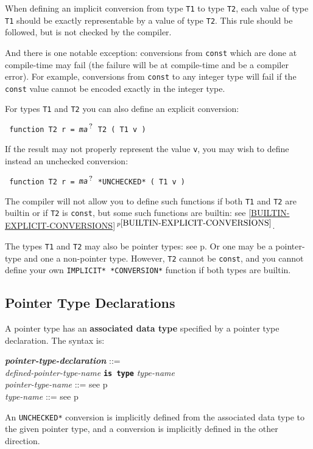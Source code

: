 \documentclass[12pt]{article}
\newcommand{\TT}[1]{{\tt \bfseries #1}}
\newcommand{\QMARK}{{$^{\,\mbox{\footnotesize ?}}$}}
\newcommand{\key}[1]{{\rm \bfseries #1}}
\newcommand{\ttkey}[1]{{\tt \bfseries #1}}
\newcommand{\emkey}[1]{{\em \bfseries #1}}
\newcommand{\itemref}[1]{\ref{#1}$\,^{p\pageref{#1}}$}
\newcommand{\pagref}[1]{p\pageref{#1}}
\newenvironment{indpar}[1][0.3in]%
	{\begin{list}{}%
		     {\setlength{\itemsep}{0in}%
		      \setlength{\topsep}{0in}%
		      \setlength{\parsep}{1ex}%
		      \setlength{\labelwidth}{#1}%
		      \setlength{\leftmargin}{#1}%
		      \addtolength{\leftmargin}{\labelsep}}%
	 \item}%
	{\end{list}}
\begin{document}
When defining an implicit conversion from type {\tt T1} to type
{\tt T2}, each value of type {\tt T1} should be exactly representable
by a value of type {\tt T2}.  This rule should be followed, but
is not checked by the compiler.

And there is one notable exception: conversions from {\tt const}
which are done at compile-time may fail (the failure will be at
compile-time and be a compiler error).  For example, conversions
from {\tt const} to any integer type will fail if the {\tt const}
value cannot be encoded exactly in the integer type.

For types {\tt T1} and {\tt T2} you
can also define an explicit conversion:
\begin{indpar} \tt
function T2 r = {\em ma}\QMARK{} T2 ( T1 v )
\end{indpar}
If the result may not properly represent the value {\tt v}, you
may wish to define instead an unchecked conversion:
\begin{indpar} \tt
function T2 r = {\em ma}\QMARK{} *UNCHECKED* ( T1 v )
\end{indpar}
The compiler will not allow you to define such functions if both
{\tt T1} and {\tt T2} are builtin or if {\tt T2} is {\tt const},
but some such functions are
builtin: see \itemref{BUILTIN-EXPLICIT-CONVERSIONS}.

The types {\tt T1} and {\tt T2} may also be pointer types:
see \pagref{POINTER-IMPLICIT-CONVERSION}.  Or one may be a pointer-type
and one a non-pointer type.  However, {\tt T2} cannot
be {\tt const}, and you cannot define your own {\tt *IMPLICIT* *CONVERSION*}
function if both types are builtin.


\subsection{Pointer Type Declarations}
\label{POINTER-TYPE-DECLARATIONS}

A pointer type has an
\key{associated data type}\label{POINTER-ASSOCIATE}
specified by a pointer type declaration.  The syntax is:

\begin{indpar}
\emkey{pointer-type-declaration}\label{POINTER-TYPE-DECLARATION} ::= \\
\hspace*{0.5in}\ttkey{pointer type} {\em defined-pointer-type-name}
	       \TT{is type} {\em type-name}
\\[0.5ex]
{\em pointer-type-name} ::= see \pagref{POINTER-TYPE-NAME}
\\[0.5ex]
{\em type-name} ::= see \pagref{TYPE-NAME}
\end{indpar}
An {\tt *UNCHECKED*} conversion is implicitly defined from the associated data
type to the given pointer type, and a conversion
is implicitly defined in the other direction.
\end{document}

